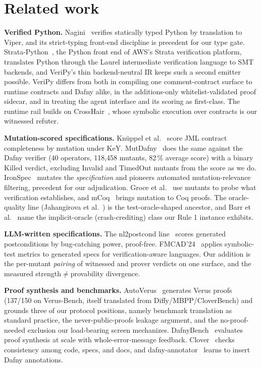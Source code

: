 \documentclass{article}
\newcommand{\toolname}{VeriPy}
\begin{document}
\section{Related work}
\label{sec:related}

\textbf{Verified Python.} Nagini~\cite{nagini} verifies statically typed
Python by translation to Viper, and its strict-typing front-end discipline
is precedent for our type gate. Strata-Python~\cite{strata}, the Python
front end of AWS's Strata verification platform, translates Python through
the Laurel intermediate verification language to SMT backends, and
\toolname{}'s thin backend-neutral IR keeps such a second emitter
possible. \toolname{} differs from both in compiling one comment-contract
surface to runtime contracts and Dafny alike, in the additions-only
whitelist-validated proof sidecar, and in treating the agent interface and
its scoring as first-class. The runtime rail builds on
CrossHair~\cite{crosshair}, whose symbolic execution over contracts is our
witnessed refuter.

\textbf{Mutation-scored specifications.} Knüppel et
al.~\cite{knuppel2021} score JML contract completeness by mutation under
KeY. MutDafny~\cite{mutdafny} does the same against the Dafny verifier
(40 operators, 118{,}458 mutants, 82\,\% average score) with a binary
Killed verdict, excluding Invalid and TimedOut mutants from the score as
we do. IronSpec~\cite{ironspec} mutates the \emph{specification} and
pioneers automated mutation-relevance filtering, precedent for our
adjudication. Groce et al.~\cite{groce} use mutants to probe what
verification establishes, and mCoq~\cite{mcoq} brings mutation to Coq
proofs. The oracle-quality line (Jahangirova et al.~\cite{jahangirova})
is the test-oracle-shaped ancestor, and Barr et al.~\cite{barr} name the
implicit-oracle (crash-crediting) class our Rule 1 instance exhibits.

\textbf{LLM-written specifications.} The nl2postcond
line~\cite{nl2postcond} scores generated postconditions by bug-catching
power, proof-free. FMCAD'24~\cite{fmcad24} applies symbolic-test metrics
to generated specs for verification-aware languages. Our addition is the
per-mutant \emph{pairing} of witnessed and prover verdicts on one
surface, and the measured strength$\neq$provability divergence.

\textbf{Proof synthesis and benchmarks.} AutoVerus~\cite{autoverus}
generates Verus proofs (137/150 on Verus-Bench, itself translated from
Diffy/MBPP/CloverBench) and grounds three of our protocol positions,
namely benchmark translation as standard practice, the
never-public-proofs leakage argument, and the no-proof-needed exclusion
our load-bearing screen mechanizes. DafnyBench~\cite{dafnybench}
evaluates proof synthesis at scale with whole-error-message feedback.
Clover~\cite{clover} checks consistency among code, specs, and docs, and
dafny-annotator~\cite{dafnyannotator} learns to insert Dafny annotations.
\end{document}
